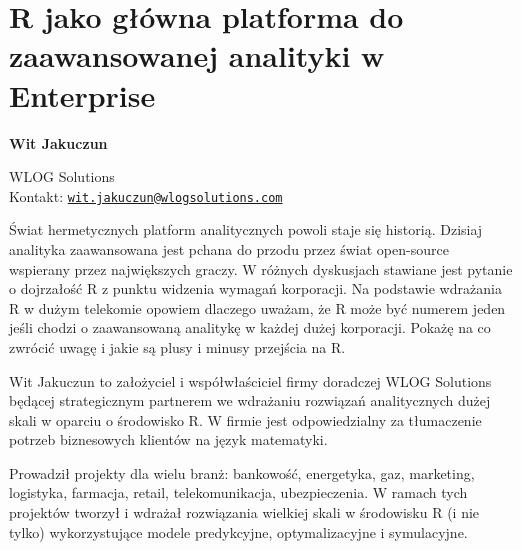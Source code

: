 \documentclass[\main/boa.tex]{subfiles}
\begin{document}
\section{R jako główna platforma do zaawansowanej analityki w Enterprise}


\begin{minipage}{0.915\textwidth}
	\centering
  {\bf \huge {} Wit Jakuczun}
\end{minipage}


\vskip 0.3cm

\begin{affiliations}
\begin{minipage}{0.915\textwidth}
\centering
\large WLOG Solutions \\[5pt]
Kontakt: \href{mailto:wit.jakuczun@wlogsolutions.com}{\nolinkurl{wit.jakuczun@wlogsolutions.com}}\\
\end{minipage}
\end{affiliations}

\vskip 0.8cm

Świat hermetycznych platform analitycznych powoli staje się historią. Dzisiaj analityka zaawansowana jest pchana do przodu przez świat open-source wspierany przez największych graczy. W różnych dyskusjach stawiane jest pytanie o dojrzałość R z punktu widzenia wymagań korporacji. Na podstawie wdrażania R w dużym telekomie opowiem dlaczego uważam, że R może być numerem jeden jeśli chodzi o zaawansowaną analitykę w każdej dużej korporacji. Pokażę na co zwrócić uwagę i jakie są plusy i minusy przejścia na R. 

\bio
Wit Jakuczun to założyciel i współwłaściciel firmy doradczej WLOG Solutions będącej strategicznym partnerem we wdrażaniu rozwiązań analitycznych dużej skali w oparciu o środowisko R. W firmie jest odpowiedzialny za tłumaczenie potrzeb biznesowych klientów na język matematyki.

Prowadził projekty dla wielu branż: bankowość, energetyka, gaz, marketing, logistyka, farmacja, retail, telekomunikacja, ubezpieczenia. W ramach tych projektów tworzył i wdrażał rozwiązania wielkiej skali w środowisku R (i nie tylko) wykorzystujące modele predykcyjne, optymalizacyjne i symulacyjne.
\end{document}
